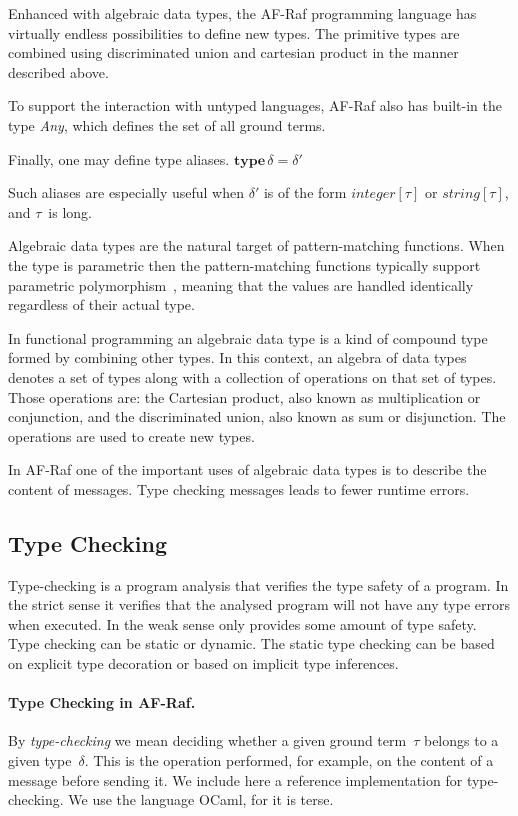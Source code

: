 \documentclass[a4paper,12pt,oneside,fleqn]{book} %
\newcommand{\todo}[1]{[\textcolor{red}{TODO}: #1]}
\begin{document}
Enhanced with algebraic data types, the AF-Raf programming language has
virtually endless possibilities to define new types. The primitive types
are combined using discriminated union and cartesian product in the manner
described above.

To support the interaction with untyped languages, AF-Raf also has built-in
the type \textit{Any}, which defines the set of all ground terms.

Finally, one may define type aliases.
$\mathbf{type}\,\delta=\delta'$

Such aliases are especially useful when $\delta'$ is of the form
$\mathit{integer}[\tau]$ or $\mathit{string}[\tau]$, and $\tau$~is long.


Algebraic data types are the natural target of pattern-matching functions.
When the type is parametric then the pattern-matching functions typically
support parametric polymorphism~\cite{AlgebraicDT09}, meaning that the
values are handled identically regardless of their actual type.

In functional programming an algebraic data type is a kind of compound type
formed by combining other types. In this context, an algebra of data types
denotes a set of types along with a collection of operations on that set of
types. Those operations are: the Cartesian product, also known as
multiplication or conjunction, and the discriminated union, also known as
sum or disjunction. The operations are used to create new types.

In AF-Raf one of the important uses of algebraic data types is to describe the content of
messages. Type checking messages leads to fewer runtime errors.

\subsection{Type Checking} %
Type-checking is a program analysis that verifies the type safety of a
program. In the strict sense it verifies that the analysed program
will not have any type errors when executed. In the weak sense only
provides some amount of type safety. Type checking can be static or
dynamic. The static type checking can be based on explicit type decoration
or based on implicit type inferences.


\paragraph{Type Checking in AF-Raf.}
By \emph{type-checking} we mean deciding whether a given ground term~$\tau$
belongs to a given type~$\delta$. This is the operation performed, for
example, on the content of a message before sending it. We include here a
reference implementation for type-checking. We use the language OCaml, for
it is terse.
\end{document}

